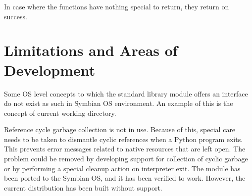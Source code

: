 In case where the functions have nothing special to return, they return 
 on success.

\section{Limitations and Areas of Development}
\label{subsec:limitations}

Some OS level concepts to which the standard  library module 
offers an interface do not exist as such in Symbian OS environment. An 
example of this is the concept of current working directory.

Reference cycle garbage collection is not in use. Because of this, special 
care needs to be taken to dismantle cyclic references when a Python program 
exits. This prevents error messages related to native resources that are 
left open. The problem could be removed by developing support for collection 
of cyclic garbage or by performing a special cleanup action on interpreter 
exit. The  module has been ported to the Symbian OS, and 
it has been verified to work. However, the current distribution has been 
built without  support.
